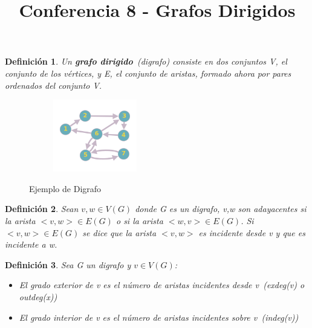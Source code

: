 \documentclass[a4paper,1pt]{report}
\title{Conferencia 8 - Grafos Dirigidos}
\author{}
\newtheorem*{dfn}{Definición}
\begin{document}
\maketitle

\begin{dfn}
 Un \textbf{grafo dirigido}~(digrafo) consiste en dos conjuntos V, el conjunto de los vértices, y E, el conjunto de aristas, formado ahora por pares ordenados del conjunto V.
\end{dfn}

\begin{figure}[H]
    \centering
    \begin{subfigure}[b]{0.80\textwidth}
        \centering
        \includegraphics[width=0.4\textwidth]{figures8/digrafo.png}
    \end{subfigure} 
    \caption{Ejemplo de Digrafo}
\end{figure} 

\begin{dfn}
 Sean $v,w\in V(G)$ donde G es un digrafo, v,w son adayacentes si la arista $<v,w>\in E(G)$ o si la arista $<w,v> \in E(G)$. Si $<v,w> \in E(G)$ se dice que la arista $<v,w>$ es incidente desde v y que es incidente a w.
\end{dfn}

\begin{dfn}
 Sea G un digrafo y $v\in V(G)$:
 \begin{itemize}
  \item El grado exterior de v es el número de aristas incidentes desde v~(exdeg(v) o outdeg(x))
  \item El grado interior de v es el número de aristas incidentes sobre v~(indeg(v))
 \end{itemize}
\end{dfn}
\end{document}
